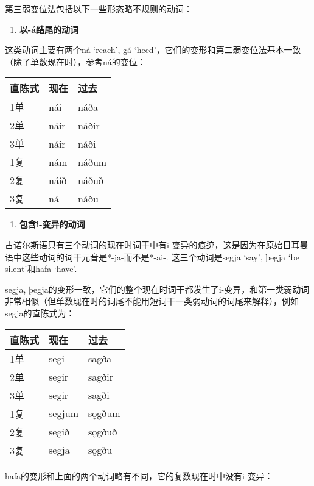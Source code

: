 第三弱变位法包括以下一些形态略不规则的动词：

\begin{enumerate}
  \def\labelenumi{\arabic{enumi})}
  \item
        \textbf{以-á结尾的动词}
\end{enumerate}

这类动词主要有两个ná `reach', gá
`heed'，它们的变形和第二弱变位法基本一致（除了单数现在时），参考ná的变位：

\begin{longtable}{lll}
  \toprule
  直陈式 & 现在   & 过去    \\
  \midrule
  \endhead
  \bottomrule
  \endfoot
  1单  & nái  & náða  \\
  2单  & náir & náðir \\
  3单  & náir & náði  \\
  1复  & nám  & náðum \\
  2复  & náið & náðuð \\
  3复  & ná   & náðu  \\
\end{longtable}

\begin{enumerate}
  \def\labelenumi{\arabic{enumi})}
  \setcounter{enumi}{1}
  \item
        \textbf{包含i-变异的动词}
\end{enumerate}

古诺尔斯语只有三个动词的现在时词干中有i-变异的痕迹，这是因为在原始日耳曼语中这些动词的词干元音是*-ja-而不是*-ai-.
这三个动词是segja `say', þegja `be silent'和hafa `have'.

segja,
þegja的变形一致，它们的整个现在时词干都发生了i-变异，和第一类弱动词非常相似（但单数现在时的词尾不能用短词干一类弱动词的词尾来解释），例如segja的直陈式为：

\begin{longtable}{lll}
  \toprule
  直陈式 & 现在     & 过去     \\
  \midrule
  \endhead
  \bottomrule
  \endfoot
  1单  & segi   & sagða  \\
  2单  & segir  & sagðir \\
  3单  & segir  & sagði  \\
  1复  & segjum & sǫgðum \\
  2复  & segið  & sǫgðuð \\
  3复  & segja  & sǫgðu  \\
\end{longtable}

hafa的变形和上面的两个动词略有不同，它的复数现在时中没有i-变异：

